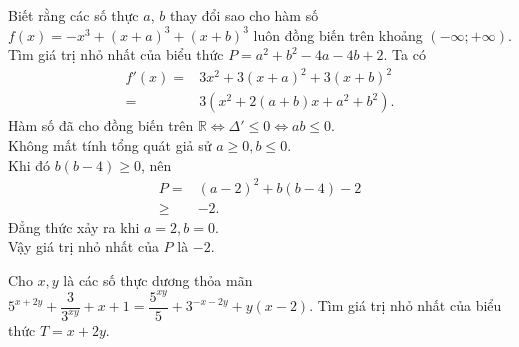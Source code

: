 \begin{bt}%
	Biết rằng các  số thực $a$, $b$ thay đổi sao cho hàm số $f(x) =-x^3 +(x+a)^3 +(x+b)^3$ luôn đồng biến trên khoảng $(-\infty;+\infty)$. Tìm giá trị nhỏ nhất của biểu thức $P= a^2+b^2 -4a-4b+2$.
	\loigiai
	{
		Ta có
		\begin{align*}
			f'(x)=&3x^2+3(x+a)^2+3(x+b)^2\\
			=& 3(x^2+2(a+b)x +a^2+b^2).
		\end{align*}
		Hàm số đã cho đồng biến trên $\mathbb{R}\Leftrightarrow \Delta '\le 0 \Leftrightarrow ab\le 0$.\\
		Không mất tính tổng quát giả sử $a\ge 0, b\le 0$.\\
		Khi đó $b(b-4)\ge 0$, nên
		\begin{align*}
			P=&(a-2)^2 +b(b-4)-2\\
			\ge & -2.
		\end{align*}
		Đẳng thức xảy ra khi $a=2,b=0.$\\
		Vậy giá trị nhỏ nhất của $P$ là $-2$.
	}
\end{bt}



\begin{bt}%
	Cho $x,y$ là các số thực dương thỏa mãn $5^{x+2y}+\dfrac{3}{3^{xy}}+x+1=\dfrac{5^{xy}}{5}+3^{-x-2y}+y(x-2)$. Tìm giá trị nhỏ nhất của biểu thức $T=x+2y$.
\end{bt}



